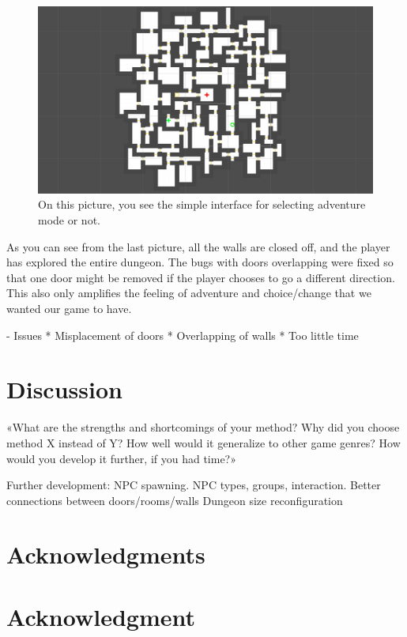 \documentclass[conference,compsoc]{IEEEtran}
\begin{document}
\begin{figure}[h]
	\graphicspath{{figures/}}
	\includegraphics[width = \columnwidth ]{BigDungeon2.png}
	\caption{On this picture, you see the simple interface for selecting adventure mode or not.}
	\label{fig:behavTree}
\end{figure}
As you can see from the last picture, all the walls are closed off, and the player has explored the entire dungeon. The bugs with doors overlapping were fixed so that one door might be removed if the player chooses to go a different direction. This also only amplifies the feeling of adventure and choice/change that we wanted our game to have.

- Issues
* Misplacement of doors
* Overlapping of walls
* Too little time
\section{Discussion}
«What are the strengths and shortcomings of your method? 
Why did you choose method X instead of Y? 
How well would it generalize to other game genres? 
How would you develop it further, if you had time?»



Further development: 
NPC spawning. 
NPC types, groups, interaction.
Better connections between doors/rooms/walls
Dungeon size reconfiguration


\ifCLASSOPTIONcompsoc
  \section*{Acknowledgments}
\else
  \section*{Acknowledgment}
\fi
\end{document}
